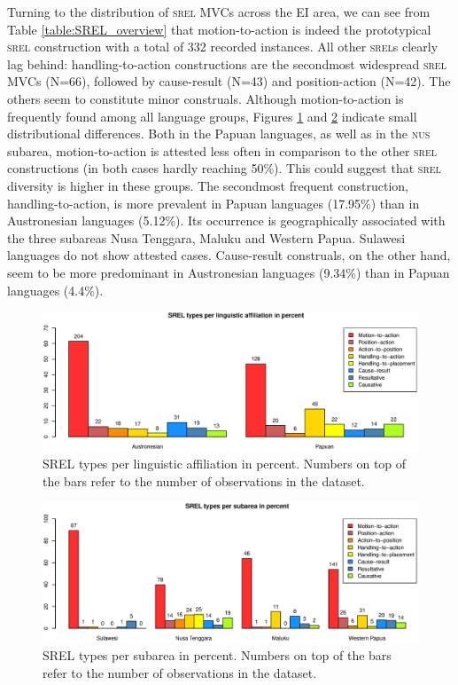 Turning to the distribution of \textsc{srel} MVCs across the EI area, we can see from Table \ref{table:SREL_overview} that motion-to-action is indeed the prototypical \textsc{srel} construction with a total of 332 recorded instances. All other \textsc{srel}s clearly lag behind: handling-to-action constructions are the secondmost widespread \textsc{srel} MVCs (N=66), followed by cause-result (N=43) and position-action (N=42). The others seem to constitute minor construals. Although motion-to-action is frequently found among all language groups, Figures \ref{fig:srel-family} and \ref{fig:srel-group} indicate small distributional differences. Both in the Papuan languages, as well as in the \textsc{nus} subarea, motion-to-action is attested less often in comparison to the other \textsc{srel} constructions (in both cases hardly reaching 50\%). This could suggest that \textsc{srel} diversity is higher in these groups. The secondmost frequent construction, handling-to-action, is more prevalent in Papuan languages (17.95\%) than in Austronesian languages (5.12\%). Its occurrence is geographically associated with the three subareas Nusa Tenggara, Maluku and Western Papua. Sulawesi languages do not show attested cases. Cause-result construals, on the other hand, seem to be more predominant in Austronesian languages (9.34\%) than in Papuan languages (4.4\%).

\begin{figure}[ht]
\includegraphics[width=\columnwidth]{figures/SREL_Family.eps}
\caption[SREL types per linguistic affiliation in percent]{SREL types per linguistic affiliation in percent. Numbers on top of the bars refer to the number of observations in the dataset.}\label{fig:srel-family}
\end{figure}
\begin{figure}[ht]
\includegraphics[width=\columnwidth]{figures/SREL_Group.eps}
\caption[SREL types per subarea in percent]{SREL types per subarea in percent. Numbers on top of the bars refer to the number of observations in the dataset.}\label{fig:srel-group}
\end{figure}

